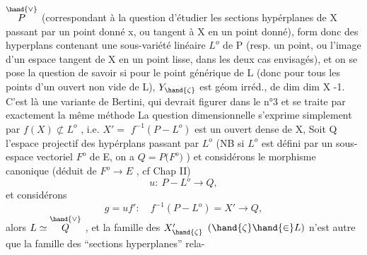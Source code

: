 
$\overset{\hand{\vee}}{P}$ (correspondant à la question d'étudier les sections hypérplanes de X
passant par un point donné x, ou tangent à X en un point  donné),
form donc des hyperplans contenant une sous-variété linéaire $L^{o}$ de P
(resp. un point,  ou l'image d'un espace tangent de X en un point lisse,
dans les deux cas envisagés), et on se pose la question de savoir si
pour le point générique \hand{$\zeta$} de L  (donc pour tous les points d'un ouvert
non vide de L),  $Y_{\hand{\zeta}}$  est  géom irréd., de
 dim  dim X -1.   C'est là une variante  de Bertini, qui devrait figurer
dans  le n°3  et se traite par exactement la même méthode  La question
dimensionnelle s'exprime simplement par  $f(X)\not\subset L^{o}$ , 
i.e.  $X' =$  $f^{-1}(P - L^{o})$   est un ouvert dense de X, 
Soit Q l'espace projectif des hypérplans passant par $L^{o}$  (NB si  $L^{o}$ est
défini par un sous-espace vectoriel $F^{o}$ de E,  on a   $Q = P($$F^{o})$ ) et
considérons le morphisme  canonique  (déduit de  $F^{o}\longrightarrow E$ , cf
Chap II)
\[ u :\ P - L^{o} \longrightarrow Q, \]
et considérons
\[ g = u f' :\quad f^{-1}(P - L^{o}) = X' \longrightarrow Q , \]
alors   $L \simeq \overset{\hand{\vee}}{Q}$ ,  et la famille des
$X'_{\hand{\zeta}}$  $(\hand{\zeta}\hand{\in} L)$  n'est autre que la famille des ``sections hyperplanes'' rela-%
